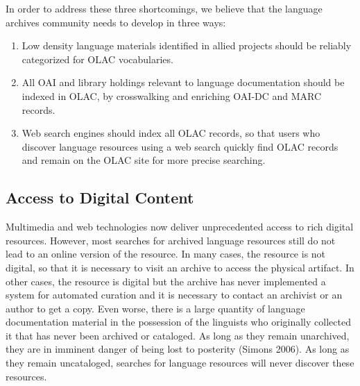 
In order to address these three shortcomings, we believe that the
language archives community needs to develop in three ways:

\begin{enumerate}\setlength{\itemsep}{0pt}
\item Low density language materials identified in allied projects
      should be reliably categorized for OLAC vocabularies.
\item All OAI and library holdings relevant to language
      documentation should be indexed in OLAC, by
      crosswalking and enriching OAI-DC and MARC records.
\item Web search engines should index all OLAC records, so that
      users who discover language resources using a web search
      quickly find OLAC records and remain on the OLAC site for
      more precise searching.
\end{enumerate}

\subsection{Access to Digital Content}

Multimedia and web technologies now deliver unprecedented access to
rich digital resources.  However, most searches for archived language
resources still do not lead to an online version of the resource.  In
many cases, the resource is not digital, so that it is necessary to
visit an archive to access the physical artifact.  In other cases, the
resource is digital but the archive has never implemented a system for
automated curation and it is necessary to contact an archivist or an
author to get a copy.  Even worse, there is a large quantity of
language documentation material in the possession of the linguists who
originally collected it that has never been archived or cataloged.
As long as they remain unarchived, they are in imminent danger of
being lost to posterity (Simons 2006).  As long as they remain
uncataloged, searches for language resources will never discover
these resources.


